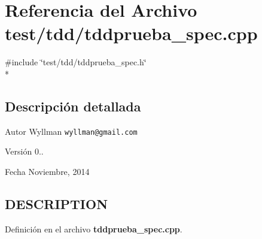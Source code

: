 \section{Referencia del Archivo test/tdd/tddprueba\+\_\+spec.cpp}
\label{tddprueba__spec_8cpp}
{\ttfamily \#include \char`\"{}test/tdd/tddprueba\+\_\+spec.\+h\char`\"{}}\\*


\subsection{Descripción detallada}
\begin{DoxyAuthor}{Autor}
Wyllman {\tt wyllman@gmail.\+com} 
\end{DoxyAuthor}
\begin{DoxyVersion}{Versión}
0.. 
\end{DoxyVersion}
\begin{DoxyDate}{Fecha}
Noviembre, 2014 
\end{DoxyDate}
\subsection{D\+E\+S\+C\+R\+I\+P\+T\+I\+O\+N}\label{main_8cpp_DESCRIPTION}


Definición en el archivo {\bf tddprueba\+\_\+spec.\+cpp}.


